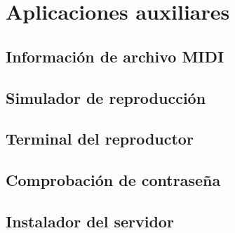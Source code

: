 \section{Aplicaciones auxiliares}
\subsection{Información de archivo MIDI}
\subsection{Simulador de reproducción}
\label{subsec:simulador_reproduccion}
\subsection{Terminal del reproductor}
\subsection{Comprobación de contraseña}
\subsection{Instalador del servidor}